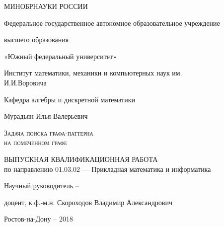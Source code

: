 \begin{center}
{ \bfseries

\large{МИНОБРНАУКИ РОССИИ}

\vspace{1cm}

\large{Федеральное государственное автономное образовательное 
	учреждение}

\large{высшего образования}

\large{«Южный федеральный университет»}

\vspace{1cm}

\large{Институт математики, механики и компьютерных наук им.\\ И.И.Воровича}
 
\large{Кафедра алгебры и дискретной математики}

\vspace{2cm}

\large{Мурадьян Илья Валерьевич}

\vspace{2cm}

\LARGE{\textsc{Задача поиска графа-паттерна\\ на помеченном графе}}

\vspace{2cm}

\large{ВЫПУСКНАЯ КВАЛИФИКАЦИОННАЯ РАБОТА\\
}
\large{по направлению 01.03.02 — Прикладная математика и информатика}
\vspace{2cm}

 
\large{ 
Научный руководитель -- 

доцент,  к.ф.-м.н. Скороходов Владимир Александрович
}

\vspace{6cm}

Ростов-на-Дону -- 2018
}
\end{center}
\thispagestyle{empty}
\pagebreak